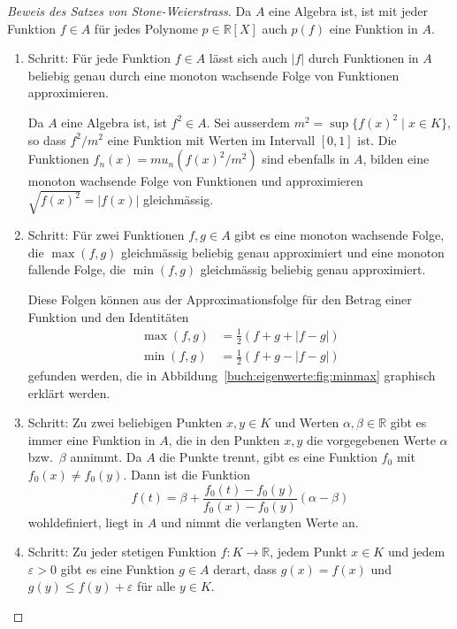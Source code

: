 \begin{proof}[Beweis des Satzes von Stone-Weierstrass]
%
%
Da $A$ eine Algebra ist, ist mit jeder Funktion $f\in A$ für jedes Polynome
$p\in\mathbb{R}[X]$ auch $p(f)$ eine Funktion in $A$.
\begin{enumerate}
\item Schritt: Für jede Funktion $f\in A$ lässt sich auch $|f|$ durch
Funktionen in $A$ beliebig genau durch eine monoton wachsende Folge
von Funktionen approximieren.

Da $A$ eine Algebra ist, ist $f^2\in A$.
Sei ausserdem $m^2=\sup \{f(x)^2\;|\;x\in K\}$, so dass $f^2/m^2$ eine Funktion
mit Werten im Intervall $[0,1]$ ist.
Die Funktionen $f_n(x)=mu_n(f(x)^2/m^2)$ sind ebenfalls in $A$,
bilden eine monoton wachsende Folge von Funktionen und
approximieren $\sqrt{f(x)^2}=|f(x)|$ gleichmässig.

\item Schritt: Für zwei Funktionen $f,g\in A$ gibt es eine monoton wachsende
Folge, die $\max(f,g)$ gleichmässig beliebig genau approximiert
und eine monoton fallende Folge, die $\min(f,g)$ gleichmässig beliebig 
genau approximiert.

Diese Folgen können aus der Approximationsfolge für den Betrag einer
Funktion und den Identitäten
\begin{equation}
\begin{aligned}
\max(f,g) &= \frac12(f+g+|f-g|) \\
\min(f,g) &= \frac12(f+g-|f-g|) 
\end{aligned}
\label{buch:eigenwerte:eqn:minmax}
\end{equation}
gefunden werden, die in Abbildung~\ref{buch:eigenwerte:fig:minmax}
graphisch erklärt werden.

\item Schritt: Zu zwei beliebigen Punkten $x,y\in K$ und Werten
$\alpha,\beta\in\mathbb{R}$ gibt es immer eine Funktion in $A$,
die in den Punkten $x,y$ die vorgegebenen Werte $\alpha$ bzw.~$\beta$
annimmt.
Da $A$ die Punkte trennt, gibt es eine Funktion $f_0$ mit $f_0(x)\ne f_0(y)$.
Dann ist die Funktion
\[
f(t)
=
\beta + \frac{f_0(t)-f_0(y)}{f_0(x)-f_0(y)}(\alpha-\beta)
\]
wohldefiniert, liegt in $A$ und nimmt die verlangten Werte an.

\item Schritt: Zu jeder stetigen Funktion $f\colon K\to\mathbb{R}$, jedem
Punkt $x\in K$ und jedem $\varepsilon>0$ gibt es eine Funktion $g\in A$ derart,
dass $g(x)=f(x)$ und $g(y) \le f(y)+\varepsilon$ für alle $y\in K$.


\end{enumerate}
\end{proof}
